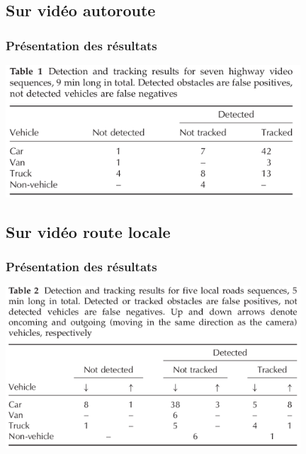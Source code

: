 \subsection{Sur vidéo autoroute}
\begin{frame}
\frametitle{Présentation des résultats}

\begin{center}
  \includegraphics[width=11cm]{image/resultats_tableau1.png}
\end{center}

\end{frame}


\subsection{Sur vidéo route locale}
\begin{frame}
\frametitle{Présentation des résultats}

\begin{center}
  \includegraphics[width=11cm]{image/resultats_tableau2.png}
\end{center}

\end{frame}
